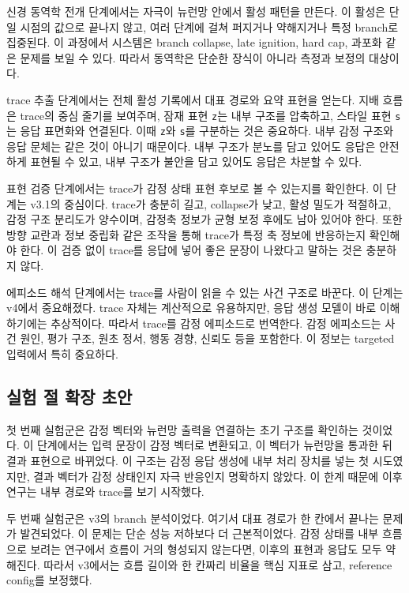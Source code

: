 \documentclass[11pt,a4paper]{article}
\newcommand{\eng}[1]{\texttt{#1}}
\begin{document}
신경 동역학 전개 단계에서는 자극이 뉴런망 안에서 활성 패턴을 만든다. 이 활성은 단일 시점의 값으로 끝나지 않고, 여러 단계에 걸쳐 퍼지거나 약해지거나 특정 branch로 집중된다. 이 과정에서 시스템은 branch collapse, late ignition, hard cap, 과포화 같은 문제를 보일 수 있다. 따라서 동역학은 단순한 장식이 아니라 측정과 보정의 대상이다.

trace 추출 단계에서는 전체 활성 기록에서 대표 경로와 요약 표현을 얻는다. 지배 흐름은 trace의 중심 줄기를 보여주며, 잠재 표현 \eng{z}는 내부 구조를 압축하고, 스타일 표현 \eng{s}는 응답 표면화와 연결된다. 이때 \eng{z}와 \eng{s}를 구분하는 것은 중요하다. 내부 감정 구조와 응답 문체는 같은 것이 아니기 때문이다. 내부 구조가 분노를 담고 있어도 응답은 안전하게 표현될 수 있고, 내부 구조가 불안을 담고 있어도 응답은 차분할 수 있다.

표현 검증 단계에서는 trace가 감정 상태 표현 후보로 볼 수 있는지를 확인한다. 이 단계는 v3.1의 중심이다. trace가 충분히 길고, collapse가 낮고, 활성 밀도가 적절하고, 감정 구조 분리도가 양수이며, 감정축 정보가 균형 보정 후에도 남아 있어야 한다. 또한 방향 교란과 정보 중립화 같은 조작을 통해 trace가 특정 축 정보에 반응하는지 확인해야 한다. 이 검증 없이 trace를 응답에 넣어 좋은 문장이 나왔다고 말하는 것은 충분하지 않다.

에피소드 해석 단계에서는 trace를 사람이 읽을 수 있는 사건 구조로 바꾼다. 이 단계는 v4에서 중요해졌다. trace 자체는 계산적으로 유용하지만, 응답 생성 모델이 바로 이해하기에는 추상적이다. 따라서 trace를 감정 에피소드로 번역한다. 감정 에피소드는 사건 원인, 평가 구조, 원초 정서, 행동 경향, 신뢰도 등을 포함한다. 이 정보는 targeted 입력에서 특히 중요하다.

\subsection{실험 절 확장 초안}

첫 번째 실험군은 감정 벡터와 뉴런망 출력을 연결하는 초기 구조를 확인하는 것이었다. 이 단계에서는 입력 문장이 감정 벡터로 변환되고, 이 벡터가 뉴런망을 통과한 뒤 결과 표현으로 바뀌었다. 이 구조는 감정 응답 생성에 내부 처리 장치를 넣는 첫 시도였지만, 결과 벡터가 감정 상태인지 자극 반응인지 명확하지 않았다. 이 한계 때문에 이후 연구는 내부 경로와 trace를 보기 시작했다.

두 번째 실험군은 v3의 branch 분석이었다. 여기서 대표 경로가 한 칸에서 끝나는 문제가 발견되었다. 이 문제는 단순 성능 저하보다 더 근본적이었다. 감정 상태를 내부 흐름으로 보려는 연구에서 흐름이 거의 형성되지 않는다면, 이후의 표현과 응답도 모두 약해진다. 따라서 v3에서는 흐름 길이와 한 칸짜리 비율을 핵심 지표로 삼고, reference config를 보정했다.
\end{document}
